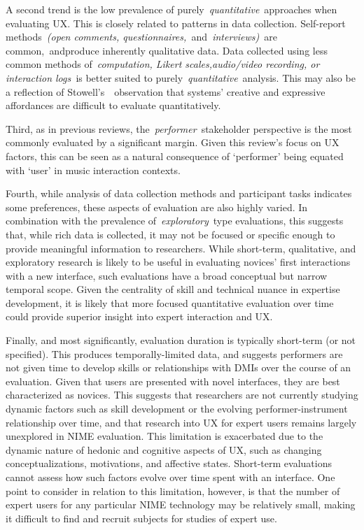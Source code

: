\documentclass[sigconf]{nimeart}
\begin{document}
A second trend is the low prevalence of purely~\emph{quantitative}~approaches when evaluating UX. This is closely related to patterns in data collection. Self-report methods~\emph{(open comments, questionnaires,~}and\emph{~interviews)}~are common,\emph{~}andproduce inherently qualitative data. Data collected using less common methods of~\emph{computation, Likert scales,audio/video recording, or interaction logs~}is better suited to purely~\emph{quantitative}~analysis. This may also be a reflection of Stowell's~\cite{c4}~observation that systems' creative and expressive affordances are difficult to evaluate quantitatively.

Third, as in previous reviews, the~\emph{performer}~stakeholder perspective is the most commonly evaluated by a significant margin. Given this review's focus on UX factors, this can be seen as a natural consequence of `performer' being equated with `user' in music interaction contexts.

Fourth, while analysis of data collection methods and participant tasks indicates some preferences, these aspects of evaluation are also highly varied. In combination with the prevalence of~\emph{exploratory}~type evaluations, this suggests that, while rich data is collected, it may not be focused or specific enough to provide meaningful information to researchers. While short-term, qualitative, and exploratory research is likely to be useful in evaluating novices' first interactions with a new interface, such evaluations have a broad conceptual but narrow temporal scope. Given the centrality of skill and technical nuance in expertise development, it is likely that more focused quantitative evaluation over time could provide superior insight into expert interaction and UX.

Finally, and most significantly, evaluation duration is typically short-term (or not specified). This produces temporally-limited data, and suggests performers are not given time to develop skills or relationships with DMIs over the course of an evaluation. Given that users are presented with novel interfaces, they are best characterized as novices. This suggests that researchers are not currently studying dynamic factors such as skill development or the evolving performer-instrument relationship over time, and that research into UX for expert users remains largely unexplored in NIME evaluation. This limitation is exacerbated due to the dynamic nature of hedonic and cognitive aspects of UX, such as changing conceptualizations, motivations, and affective states. Short-term evaluations cannot assess how such factors evolve over time spent with an interface. One point to consider in relation to this limitation, however, is that the number of expert users for any particular NIME technology may be relatively small, making it difficult to find and recruit subjects for studies of expert use.
\end{document}
